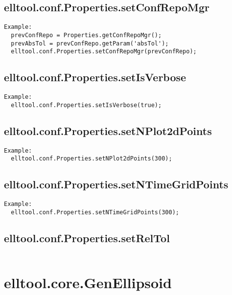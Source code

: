 \subsection{\texorpdfstring{elltool.conf.Properties.setConfRepoMgr}{setConfRepoMgr}}\label{method:elltool.conf.Properties.setConfRepoMgr}
\begin{verbatim}
Example:
  prevConfRepo = Properties.getConfRepoMgr();
  prevAbsTol = prevConfRepo.getParam('absTol');
  elltool.conf.Properties.setConfRepoMgr(prevConfRepo);
\end{verbatim}
\subsection{\texorpdfstring{elltool.conf.Properties.setIsVerbose}{setIsVerbose}}\label{method:elltool.conf.Properties.setIsVerbose}
\begin{verbatim}
Example:
  elltool.conf.Properties.setIsVerbose(true);
\end{verbatim}
\subsection{\texorpdfstring{elltool.conf.Properties.setNPlot2dPoints}{setNPlot2dPoints}}\label{method:elltool.conf.Properties.setNPlot2dPoints}
\begin{verbatim}
Example:
  elltool.conf.Properties.setNPlot2dPoints(300);
\end{verbatim}
\subsection{\texorpdfstring{elltool.conf.Properties.setNTimeGridPoints}{setNTimeGridPoints}}\label{method:elltool.conf.Properties.setNTimeGridPoints}
\begin{verbatim}
Example:
  elltool.conf.Properties.setNTimeGridPoints(300);
\end{verbatim}
\subsection{\texorpdfstring{elltool.conf.Properties.setRelTol}{setRelTol}}\label{method:elltool.conf.Properties.setRelTol}
\begin{verbatim}

\end{verbatim}
\section{elltool.core.GenEllipsoid}\label{secClassDescr:elltool.core.GenEllipsoid}
